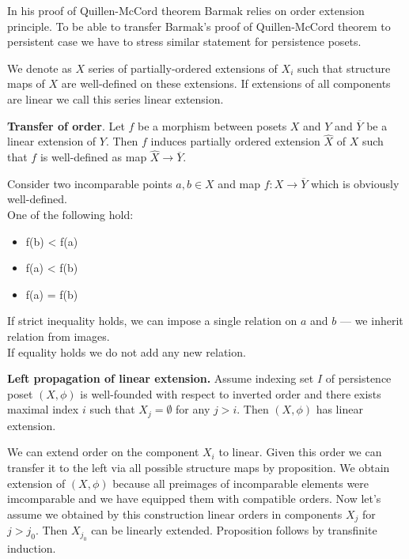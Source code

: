 In his proof of Quillen-McCord theorem Barmak relies on order extension principle. To be able to transfer Barmak's proof of Quillen-McCord theorem to persistent case we have to stress similar statement for persistence posets.

\begin{definition}
  We denote as  $X$ series of partially-ordered extensions of $X_i$ such that structure maps of $X$ are well-defined on these extensions. If extensions of all components are linear we call this series linear extension.
\end{definition}

\begin{proposition}
  \textbf{Transfer of order}. Let $f$ be a morphism between posets $X$ and $Y$ and $\overline{Y}$ be a linear extension of $Y$. Then $f$ induces partially ordered extension $\hat{X}$ of $X$ such that $f$ is well-defined as map $\hat{X} \to \overline{Y}$.
\end{proposition}

\begin{pf}
  Consider two incomparable points $a, b \in X$ and map $f : X \to \overline{Y}$ which is obviously well-defined.\\
  One of the following hold:\\
  \begin{itemize}
    \item f(b) < f(a)
    \item f(a) < f(b)
    \item f(a) = f(b)
  \end{itemize}
  If strict inequality holds, we can impose a single relation on $a$ and $b$ --- we inherit relation from images.\\
  If equality holds we do not add any new relation.
\end{pf}

\begin{proposition}
  \textbf{Left propagation of linear extension.} Assume indexing set $I$ of persistence poset $(X,\phi)$ is well-founded with respect to inverted order and there exists maximal index $i$ such that $X_j = \emptyset$ for any $j > i$. Then $(X,\phi)$ has linear extension.
\end{proposition}

\begin{pf}
  We can extend order on the component $X_i$ to linear. Given this order we can transfer it to the left via all possible structure maps by proposition. We obtain extension of $(X,\phi)$ because all preimages of incomparable elements were imcomparable and we have equipped them with compatible orders. Now let's assume we obtained by this construction linear orders in components $X_j$ for $j > j_0$. Then $X_{j_0}$ can be linearly extended. Proposition follows by transfinite induction.
\end{pf}\\


